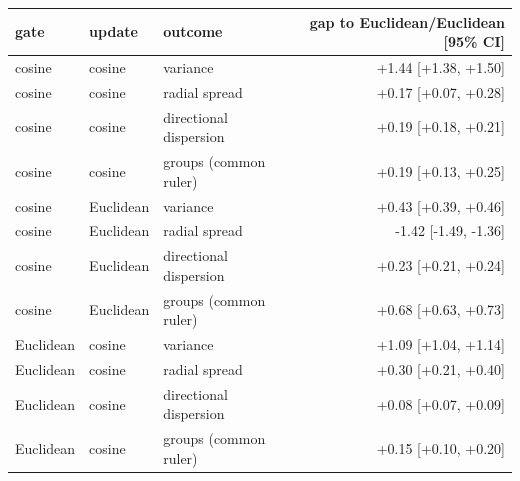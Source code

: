 \begin{tabular}{lllr}
\toprule
gate & update & outcome & gap to Euclidean/Euclidean [95\% CI] \\
\midrule
cosine & cosine & variance & +1.44 [+1.38, +1.50] \\
cosine & cosine & radial spread & +0.17 [+0.07, +0.28] \\
cosine & cosine & directional dispersion & +0.19 [+0.18, +0.21] \\
cosine & cosine & groups (common ruler) & +0.19 [+0.13, +0.25] \\
cosine & Euclidean & variance & +0.43 [+0.39, +0.46] \\
cosine & Euclidean & radial spread & -1.42 [-1.49, -1.36] \\
cosine & Euclidean & directional dispersion & +0.23 [+0.21, +0.24] \\
cosine & Euclidean & groups (common ruler) & +0.68 [+0.63, +0.73] \\
Euclidean & cosine & variance & +1.09 [+1.04, +1.14] \\
Euclidean & cosine & radial spread & +0.30 [+0.21, +0.40] \\
Euclidean & cosine & directional dispersion & +0.08 [+0.07, +0.09] \\
Euclidean & cosine & groups (common ruler) & +0.15 [+0.10, +0.20] \\
\bottomrule
\end{tabular}
